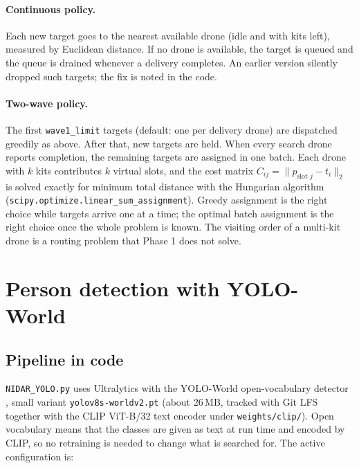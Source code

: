 \documentclass[11pt,a4paper]{article}
\newcommand{\code}[1]{\texttt{#1}}
\begin{document}
\paragraph{Continuous policy.} Each new target goes to the nearest available drone (idle and with kits
left), measured by Euclidean distance. If no drone is available, the target is queued and the queue is
drained whenever a delivery completes. An earlier version silently dropped such targets; the fix is noted in
the code.

\paragraph{Two-wave policy.} The first \code{wave1\_limit} targets (default: one per delivery drone) are
dispatched greedily as above. After that, new targets are held. When every search drone reports completion,
the remaining targets are assigned in one batch. Each drone with $k$ kits contributes $k$ virtual slots, and
the cost matrix $C_{ij} = \lVert p_{\text{slot }j} - t_i\rVert_2$ is solved exactly for minimum total
distance with the Hungarian algorithm \cite{kuhn1955} (\code{scipy.optimize.linear\_sum\_assignment}).
Greedy assignment is the right choice while targets arrive one at a time; the optimal batch assignment is
the right choice once the whole problem is known. The visiting order of a multi-kit drone is a routing
problem that Phase 1 does not solve.

\section{Person detection with YOLO-World}
\label{sec:yolo}

\subsection{Pipeline in code}

\code{NIDAR\_YOLO.py} uses Ultralytics \cite{ultralytics} with the YOLO-World open-vocabulary detector
\cite{yoloworld}, small variant \code{yolov8s-worldv2.pt} (about 26\,MB, tracked with Git LFS together with
the CLIP ViT-B/32 text encoder under \code{weights/clip/}). Open vocabulary means that the classes are given
as text at run time and encoded by CLIP, so no retraining is needed to change what is searched for. The
active configuration is:
\end{document}
